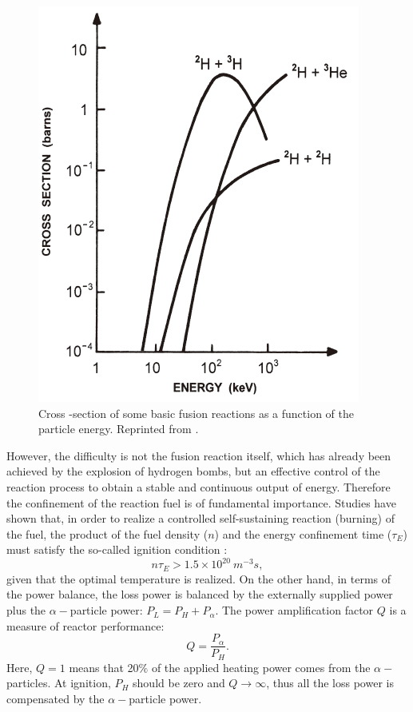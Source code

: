 \begin{figure}[h]
\begin{centering}
\includegraphics[scale=0.6]{cross_section_vs_energy.png}
\par\end{centering}
\caption{Cross -section of some basic fusion reactions as a function of the particle energy. Reprinted from \cite{Bittencourt_2004_Plasma}.}
\label{fig:cross_section_vs_energy}
\end{figure}


However, the difficulty is not the fusion reaction itself, which has already been achieved by the explosion of hydrogen bombs, but an effective control of the reaction process to obtain a stable and continuous output of energy. Therefore the confinement of the reaction fuel is of fundamental importance. Studies have shown that, in order to realize a controlled self-sustaining reaction (burning) of the fuel, the product of the fuel density ($n$) and the energy confinement time ($\tau_{E}$) must satisfy the so-called ignition condition \cite{Wesson_1997_Tokamaks}:%
\begin{equation}
    n\tau_E > 1.5 \times 10^{20}\ m^{-3}s,
\end{equation}
\noindent given that the optimal temperature is realized. On the other hand, in terms of the power balance, the loss power is balanced by the externally supplied power plus the $\alpha-$particle power: $P_L = P_H + P_{\alpha}$. The power amplification factor $Q$ is a measure of reactor performance:%
\begin{equation} \label{eq:Q}
   Q = \frac{P_{\alpha}}{P_H}.
\end{equation}
\noindent Here, $Q = 1$ means that 20$\%$ of the applied heating power comes from the $\alpha-$particles. At ignition, $P_H$ should be zero and $Q \rightarrow \infty$, thus all the loss power is compensated by the $\alpha-$particle power.

